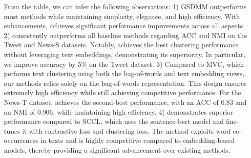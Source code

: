 From the table, we can infer the following observations: 
1) GSDMM outperforms most methods while maintaining simplicity, elegance, and high efficiency. With enhancements, \sysname{} achieves significant performance improvements across all aspects.
2) \sysname{} consistently outperforms all baseline methods regarding ACC and NMI on the Tweet and News-S datasets. Notably, \sysname{} achieves the best clustering performance without leveraging text embeddings, demonstrating its superiority. In particular, we improve accuracy by 5\% on the Tweet dataset.
3) Compared to MVC, which performs text clustering using both the bag-of-words and text embedding views, our methods relies solely on the bag-of-words representation. This design ensures extremely high efficiency while still achieving competitive performance. For the News-T dataset, \sysname{} achieves the second-best performance, with an ACC of 0.83 and an NMI of 0.906, while maintaining high efficiency. 
4) \sysname{} demonstrates superior performance compared to SCCL, which uses the sentence-bert model and fine-tunes it with contrastive loss and clustering loss. The method exploits word co-occurrences in texts and is highly competitive compared to embedding-based models, thereby providing a significant advancement over existing methods.
